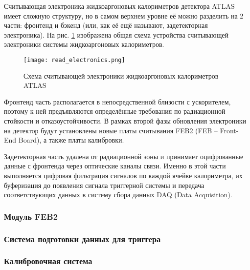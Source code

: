 Считывающая электроника жидкоаргоновых калориметров детектора ATLAS имеет сложную структуру, но в самом верхнем уровне её можно разделить на 2 части: фронтенд и бэкенд (или, как её ещё называют, задетекторная электроника). На рис. \ref{fig:read_electronics} изображена общая схема устройства считывающей электроники системы жидкоаргоновых калориметров.
\begin{figure}[ht]
    \centering
    \texttt{[image: read\_electronics.png]}
    \caption{Схема считывающей электроники жидкоаргоновых калориметров ATLAS}
    \label{fig:read_electronics}
\end{figure}\par
Фронтенд часть располагается в непосредственной близости с ускорителем, поэтому к ней предъявляются определённые требования по радиационной стойкости и отказоустойчивости. В рамках второй фазы обновления электроники на детектор будут установлены новые платы считывания FEB2 (FEB -- Front-End Board), а также платы калибровки.\par
Задетекторная часть удалена от радиационной зоны и принимает оцифрованные данные с фронтенда через оптические каналы связи. Именно в этой части выполняется цифровая фильтрация сигналов по каждой ячейке калориметра, их буферизация до появления сигнала триггерной системы и передача соответствующих данных в систему сбора данных DAQ (Data Acquisition).\par

\subsubsection{Модуль FEB2}


\subsubsection{Система подготовки данных для триггера}


\subsubsection{Калибровочная система}


